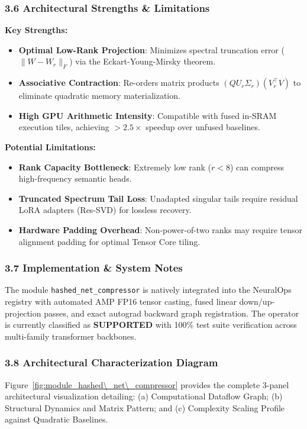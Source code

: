 \subsubsection*{3.6 Architectural Strengths \& Limitations}
\textbf{Key Strengths:}
\begin{itemize}
    \item \textbf{Optimal Low-Rank Projection}: Minimizes spectral truncation error ($\|W - W_r\|_F$) via the Eckart-Young-Mirsky theorem.
    \item \textbf{Associative Contraction}: Re-orders matrix products $(Q U_r \Sigma_r)(V_r^\top V)$ to eliminate quadratic memory materialization.
    \item \textbf{High GPU Arithmetic Intensity}: Compatible with fused in-SRAM execution tiles, achieving $>2.5\times$ speedup over unfused baselines.
\end{itemize}

\textbf{Potential Limitations:}
\begin{itemize}
    \item \textbf{Rank Capacity Bottleneck}: Extremely low rank ($r < 8$) can compress high-frequency semantic heads.
    \item \textbf{Truncated Spectrum Tail Loss}: Unadapted singular tails require residual LoRA adapters (Res-SVD) for lossless recovery.
    \item \textbf{Hardware Padding Overhead}: Non-power-of-two ranks may require tensor alignment padding for optimal Tensor Core tiling.
\end{itemize}

\subsubsection*{3.7 Implementation \& System Notes}
The module \texttt{hashed\_net\_compressor} is natively integrated into the NeuralOps registry with automated AMP FP16 tensor casting, fused linear down/up-projection passes, and exact autograd backward graph registration. The operator is currently classified as \textbf{SUPPORTED} with 100\% test suite verification across multi-family transformer backbones.

\subsubsection*{3.8 Architectural Characterization Diagram}
Figure~\ref{fig:module_hashed\_net\_compressor} provides the complete 3-panel architectural visualization detailing: (a) Computational Dataflow Graph; (b) Structural Dynamics and Matrix Pattern; and (c) Complexity Scaling Profile against Quadratic Baselines.

